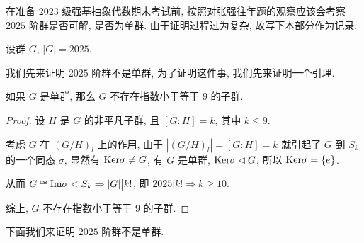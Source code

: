 \specialsectiontrue
{}

在准备 $2023$ 级强基抽象代数期末考试前, 按照对张强往年题的观察应该会考察 $2025$ 阶群是否可解, 是否为单群.
由于证明过程过为复杂, 故写下本部分作为记录.

设群 $G$, $|G|=2025$.

我们先来证明 $2025$ 阶群不是单群, 为了证明这件事, 我们先来证明一个引理.

\begin{lemma}\label{lemma:2025.1}
	如果 $G$ 是单群, 那么 $G$ 不存在指数小于等于 $9$ 的子群.
\end{lemma}

\begin{proof}
	设 $H$ 是 $G$ 的非平凡子群, 且 $[G:H]=k$, 其中 $k\leqslant 9$.

	考虑 $G$ 在 $(G/H)_l$ 上的作用, 由于 $|(G/H)_l|=[G:H]=k$
	就引起了 $G$ 到 $S_k$ 的一个同态 $\sigma$, 显然有 $\text {Ker}\sigma\neq G$, 有 $G$ 是单群, $\text {Ker}\sigma\lhd G$, 所以 $\text {Ker}\sigma=\{e\}$.

	从而 $G\cong \text {Im}\sigma < S_k\Rightarrow |G|\big| k!$, 即 $2025|k!\Rightarrow k\geqslant 10$.

	综上, $G$ 不存在指数小于等于 $9$ 的子群.
\end{proof}

下面我们来证明 $2025$ 阶群不是单群.

